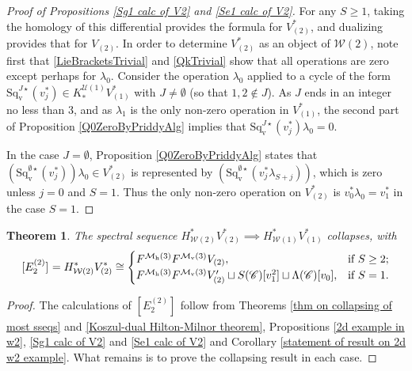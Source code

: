\documentclass[11pt]{amsart} \renewcommand{\baselinestretch}{1.2}
\theoremstyle{plain}
\newtheorem{thm}{Theorem}[section] %
\numberwithin{equation}{section} %
\theoremstyle{plain}
\newtheorem{thm}{Theorem}[chapter] %
\numberwithin{equation}{chapter} %
\newcommand{\scrC}{\mathscr{C}}
\newcommand{\calU}{\mathcal{U}}
\newcommand{\calw}{\mathcal{W}}
\newcommand{\calmv}{\mathcal{M}\dver}
\newcommand{\calmh}{\mathcal{M}\dhor}
\newcommand{\CommOperad}{{\scrC}}
\newcommand{\E}[5]{[E^{#1}_{#2}#3]^{#4}_{#5}}
\newcommand{\dver}{_\mathrm{v}}
\newcommand{\dhor}{_\mathrm{h}}
\newcommand{\Sqvstar}[1]{\mathrm{Sq}\dver^{#1\star}}
\begin{document}
\begin{Calculations of HWn}
\begin{proof}[Proof of Propositions \ref{Sg1 calc of V2} and \ref{Se1 calc of V2}]
For any $S\geq1$, taking the homology of this differential provides the formula for $V^*_{(2)}$, and dualizing provides that for $V_{(2)}$.
In order to determine $V^*_{(2)}$ as an object of $\calw(2)$, note first that \ref{LieBracketsTrivial} and \ref{QkTrivial} show that all operations are zero except perhaps for $\lambda_0$. %
Consider the operation $\lambda_0$ applied to a cycle of the form $\Sqvstar{J}(v_{j}^*)\in K_{*}^{\calU(1)}V^*_{(1)}$ with $J\neq\emptyset$ (so that $1,2\notin J$). As $J$ ends in an integer no less than 3, and as $\lambda_1$ is the only non-zero operation in $V^*_{(1)}$, the second part of Proposition \ref{Q0ZeroByPriddyAlg} implies that $\Sqvstar{J}(v_{j}^*)\lambda_0=0$.

In the case $J=\emptyset$, Proposition \ref{Q0ZeroByPriddyAlg} states that $(\Sqvstar{\emptyset}(v_{j}^*))\lambda_0\in V^*_{(2)}$ is represented by $(\Sqvstar{\emptyset}(v_{j}^*\lambda_{S+j}))$, which is zero unless $j=0$ and $S=1$. Thus the only non-zero operation on $V^*_{(2)}$ is $v_0^*\lambda_0=v_1^*$ in the case $S=1$.
\end{proof}
\begin{thm}
\label{W2 to W1 collapse}
The spectral sequence $H^*_{\calw(2)}V^*_{(2)}\implies H^*_{\calw(1)}V^*_{(1)}$ collapses, with
\[\E{(2)}{2}{}{}{}=H^*_{\calw(2)}V^*_{(2)}\cong\begin{cases}
F^{\calmh(3)}F^{\calmv(3)}V_{(2)},&\textup{if }S\geq2;\\
F^{\calmh(3)}F^{\calmv(3)}V'_{(2)}\sqcup S(\CommOperad) [v_1^{2}]\sqcup \Lambda(\CommOperad)[v_0],&\textup{if }S=1.
\end{cases}
\]
\end{thm}
\begin{proof}
The calculations of $\E{(2)}{2}{}{}{}$ follow from  Theorems \ref{thm on collapsing of most sseqs} and \ref{Koszul-dual Hilton-Milnor theorem}, Propositions \ref{2d example in w2}, \ref{Sg1 calc of V2} and \ref{Se1 calc of V2}  and Corollary \ref{statement of result on 2d w2 example}. What remains is to prove the collapsing result in each case.


\end{proof}
\end{Calculations of HWn}
\end{document}
